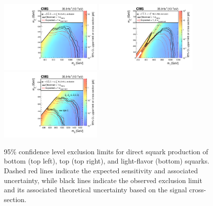 \begin{figure}
	\centering
	\includegraphics[width=0.45\textwidth]{results/figs/interpretations/T2bb_35p9ifb_Moriond2017_Mar07_XSEC}
	\includegraphics[width=0.45\textwidth]{results/figs/interpretations/T2tt_35p9ifb_Moriond2017_Mar07_XSEC}
	\includegraphics[width=0.45\textwidth]{results/figs/interpretations/T2qq_35p9ifb_Moriond2017_Mar07_XSEC}
	\caption{95\% confidence level exclusion limits for direct squark production of bottom (top left), top (top right), and light-flavor (bottom) squarks. Dashed red lines indicate the expected sensitivity and associated uncertainty, while black lines indicate the observed exclusion limit and its associated theoretical uncertainty based on the signal cross-section.}
	\label{fig:limitsSquark}
\end{figure}
